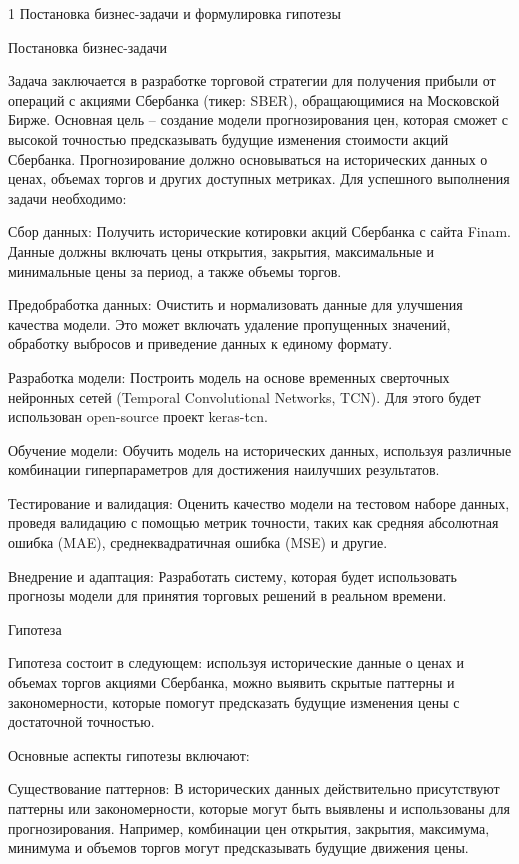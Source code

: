 
1 Постановка бизнес-задачи и формулировка гипотезы

Постановка бизнес-задачи

Задача заключается в разработке торговой стратегии для получения прибыли от операций с акциями Сбербанка (тикер: SBER), обращающимися на Московской Бирже. Основная цель – создание модели прогнозирования цен, которая сможет с высокой точностью предсказывать будущие изменения стоимости акций Сбербанка. Прогнозирование должно основываться на исторических данных о ценах, объемах торгов и других доступных метриках.
Для успешного выполнения задачи необходимо:

Сбор данных: Получить исторические котировки акций Сбербанка с сайта Finam. Данные должны включать цены открытия, закрытия, максимальные и минимальные цены за период, а также объемы торгов.

Предобработка данных: Очистить и нормализовать данные для улучшения качества модели. Это может включать удаление пропущенных значений, обработку выбросов и приведение данных к единому формату.

Разработка модели: Построить модель на основе временных сверточных нейронных сетей (Temporal Convolutional Networks, TCN). Для этого будет использован open-source проект keras-tcn.

Обучение модели: Обучить модель на исторических данных, используя различные комбинации гиперпараметров для достижения наилучших результатов.

Тестирование и валидация: Оценить качество модели на тестовом наборе данных, проведя валидацию с помощью метрик точности, таких как средняя абсолютная ошибка (MAE), среднеквадратичная ошибка (MSE) и другие.

Внедрение и адаптация: Разработать систему, которая будет использовать прогнозы модели для принятия торговых решений в реальном времени.


\newpage
Гипотеза

Гипотеза состоит в следующем: используя исторические данные о ценах и объемах торгов акциями Сбербанка, можно выявить скрытые паттерны и закономерности, которые помогут предсказать будущие изменения цены с достаточной точностью.

Основные аспекты гипотезы включают:

Существование паттернов: В исторических данных действительно присутствуют паттерны или закономерности, которые могут быть выявлены и использованы для прогнозирования. Например, комбинации цен открытия, закрытия, максимума, минимума и объемов торгов могут предсказывать будущие движения цены.

